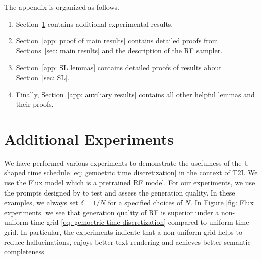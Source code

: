 \documentclass{article}
\theoremstyle{plain}
\theoremstyle{definition}
\theoremstyle{remark}
\begin{document}




\newpage
\appendix
\onecolumn
The appendix is organized as follows.
\begin{enumerate}
    \item Section~\ref{sec:appendix:exp} contains additional experimental results.
    \item Section~\ref{app: proof of main results} contains detailed proofs from Sections~\ref{sec: main results} and the description of the RF sampler.
    \item Section~\ref{app: SL lemmas} contains detailed proofs of results about Section~\ref{sec: SL}.
    \item Finally, Section~\ref{app: auxiliary results} contains all other helpful lemmas and their proofs.
\end{enumerate}

\section{Additional Experiments}\label{sec:appendix:exp}
We have performed various experiments to demonstrate the usefulness of the U-shaped time schedule \eqref{eq: gemoetric time discretization} in the context of T2I. We use the Flux model \citep{flux2024, labs2025flux1kontextflowmatching} which is a pretrained RF model. For our experiments, we use the prompts designed by
\citet{liu2023character, hu2025amo} to test and assess the generation quality. In these examples, we always set $\delta = 1/N$  for a specified choices of $N$. In Figure \ref{fig: Flux experiments} we see that generation quality of RF is superior under a non-uniform time-grid \eqref{eq: gemoetric time discretization} compared to uniform time-grid. In particular, the experiments indicate that a non-uniform grid helps to reduce hallucinations, enjoys better text rendering and achieves better semantic completeness.
\end{document}

